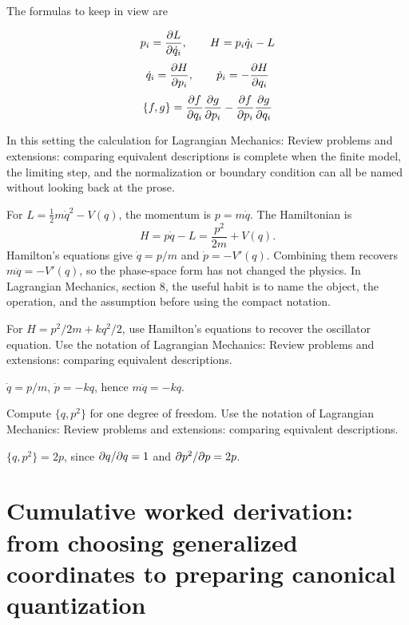 The formulas to keep in view are

\[
  p_i=\frac{\partial L}{\partial\dot q_i},\qquad H=p_i\dot q_i-L
\]
\[
  \dot q_i=\frac{\partial H}{\partial p_i},\qquad \dot p_i=-\frac{\partial H}{\partial q_i}
\]
\[
  \{f,g\}=\frac{\partial f}{\partial q_i}\frac{\partial g}{\partial p_i}-\frac{\partial f}{\partial p_i}\frac{\partial g}{\partial q_i}
\]

In this setting the calculation for Lagrangian Mechanics: Review problems and extensions: comparing equivalent descriptions is complete when the finite model, the limiting step, and the normalization or boundary condition can all be named without looking back at the prose.




\begin{example}
For \(L=\frac12m\dot q^2-V(q)\), the momentum is \(p=m\dot q\).  The Hamiltonian is
\[
  H=p\dot q-L=\frac{p^2}{2m}+V(q).
\]
Hamilton's equations give \(\dot q=p/m\) and \(\dot p=-V'(q)\).  Combining them recovers \(m\ddot q=-V'(q)\), so the phase-space form has not changed the physics.  In Lagrangian Mechanics, section 8, the useful habit is to name the object, the operation, and the assumption before using the compact notation.
\end{example}



\begin{exercise}
For \(H=p^2/2m+kq^2/2\), use Hamilton's equations to recover the oscillator equation.  Use the notation of Lagrangian Mechanics: Review problems and extensions: comparing equivalent descriptions.
\begin{answer}
\(\dot q=p/m\), \(\dot p=-kq\), hence \(m\ddot q=-kq\).
\end{answer}
\end{exercise}

\begin{exercise}
Compute \(\{q,p^2\}\) for one degree of freedom.  Use the notation of Lagrangian Mechanics: Review problems and extensions: comparing equivalent descriptions.
\begin{answer}
\(\{q,p^2\}=2p\), since \(\partial q/\partial q=1\) and \(\partial p^2/\partial p=2p\).
\end{answer}
\end{exercise}



\section{Cumulative worked derivation: from choosing generalized coordinates to preparing canonical quantization}


